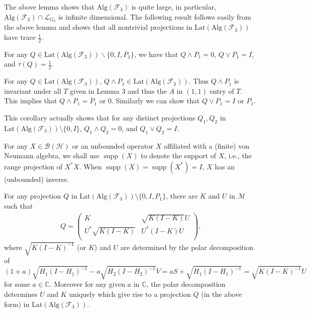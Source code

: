 \documentclass{pnastwo}
\newenvironment{proof}[1][Proof]{\begin{trivlist}
\item[\hskip \labelsep {\bfseries #1}]}{\end{trivlist}}
\newcommand{\B}{\mathcal B}
\newcommand{\F}{\mathcal F}
\newcommand{\HHH}{\mathcal H} %
\newcommand{\LLL}{\mathcal L} %
\newcommand{\M}{\mathcal M}
\newcommand{\supp}{\mathop{\mathrm supp}}
\newcommand{\Lat}{\mathrm{Lat}}
\newcommand{\Alg}{\mathrm{Alg}}
\newcommand{\C}{\mathbb C} %
\begin{document}
\begin{article}
The above lemma shows that $\Alg(\F_3)$ is quite large, in
particular, $\Alg(\F_3)\cap\LLL_{G_3}$ is infinite dimensional. The
following result follows easily from the above lemma and shows
that all nontrivial projections in $\Lat(\Alg(\F_3))$ have trace
$\frac12$.

\begin{corollary}
For any $Q \in
\Lat(\Alg(\F_3)) \backslash \{0, I, P_1\}$, we have that $Q \wedge
P_{1} = 0$, $Q \vee P_{1} = I$, and  $\tau(Q) = \frac{1}{2}$.
\end{corollary}

\begin{proof}
For any $Q \in \Lat(\Alg(\F_3))$,
$Q\wedge P_1\in\Lat(\Alg(\F_3))$. Thus $Q\wedge P_1$ is invariant
under all $T$ given in Lemma 3 and thus the $A$ in $(1,1)$ entry
of $T$. This implies that $Q\wedge P_1=P_1$ or $0$. Similarly we
can show that $Q\vee P_1=I$ or $P_1$.
\end{proof}

This corollary actually shows that for any distinct projections
$Q_{1}, Q_{2}$ in $\Lat(\Alg(\F_3)) \setminus \{0,I\}$, $Q_{1}
\wedge Q_{2} = 0$, and $Q_{1} \vee Q_{2} = I$.

For any $X\in\B(\HHH)$ or an unbounded operator $X$ affiliated with
a (finite) von Neumann algebra, we shall use $\supp(X)$ to denote
the support of $X$, i.e., the range projection of $X^*X$. When
$\supp(X)=\supp(X^*)=I$, $X$ has an (unbounded) inverse.

\begin{theorem}
For any projection $Q$
in $\Lat(\Alg(\F_3)) \setminus \{0, I, P_{1}\}$, there are $K$ and
$U$ in $\M$ such that
\begin{align*}
Q = \left(
     \begin{array}{cc}
      K & \sqrt{K(I-K)}U \\
      U^{*}\sqrt{K(I-K)} & U^{*}(I-K)U \\
  \end{array}
\right) ,
\end{align*}
where $\sqrt{K(I-K)^{-1}}$ (or $K$) and $U$ are determined by the
polar decomposition of $(1+a)\sqrt{H_{1}(I-H_{1})^{-1}}-
a\sqrt{H_{2}(I-H_{2})^{-1}}V =aS + \sqrt{H_{1}(I-H_{1})^{-1}}=
\sqrt{K(I-K)^{-1}} U$ for some $a \in \C$. Moreover for any given
$a$ in $\C$, the polar decomposition determines $U$ and $K$
uniquely which give rise to a projection $Q$ (in the above form)
in $\Lat(\Alg(\F_3))$.
\end{theorem}


\end{article}
\end{document}
